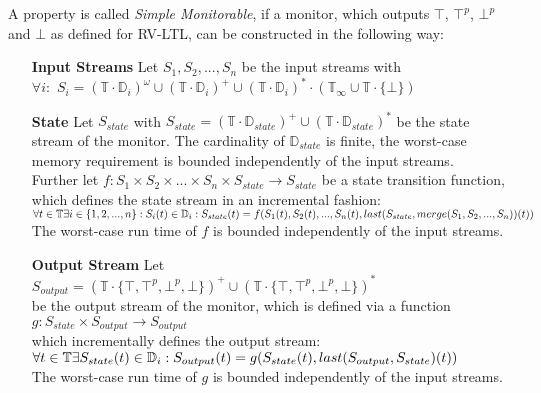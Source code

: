 		\begin{definition}
			A property is called \textit{Simple Monitorable}, if a monitor, which outputs $\top$, $\top^p$, $\bot^p$ and $\bot$ as defined for RV-LTL, can be constructed in the following way:
			\begin{itemize}
				\item[\textbf{Input Streams}]
					Let $S_1, S_2, ..., S_n$ be the input streams with\\
					$\forall i:$ $S_i=(\mathbb{T}\cdot \mathbb{D}_i)^\omega\cup(\mathbb{T}\cdot \mathbb{D}_i)^+\cup(\mathbb{T}\cdot \mathbb{D}_i)^*\cdot(\mathbb{T}_\infty\cup\mathbb{T}\cdot\{\bot\})$
				\item[\textbf{State}]
					Let $S_{state}$ with $S_{state}= (\mathbb{T}\cdot \mathbb{D}_{state})^+\cup(\mathbb{T}\cdot \mathbb{D}_{state})^*$ be the state stream of the monitor. The cardinality of $\mathbb{D}_{state}$ is finite, the worst-case memory requirement is bounded independently of the input streams.\\
					Further let $f: S_1 \times S_2 \times ... \times S_n \times S_{state}\rightarrow S_{state}$ be a state transition function, which defines the state stream in an incremental fashion:\\
					\begin{math}
						\forall t\in \mathbb T \exists i\in \{1,2,...,n\}: S_i(t)\in\mathbb D_i:\\
						S_{state}(t)= f(S_1(t), S_2(t), ..., S_n(t), last(S_{state}, merge(S_1, S_2, ..., S_n))(t))
					\end{math}\\
					The worst-case run time of $f$ is bounded independently of the input streams.
				\item[\textbf{Output Stream}]
					Let $S_{output}= (\mathbb{T}\cdot \{\top, \top^p, \bot^p, \bot\})^+\cup(\mathbb{T}\cdot \{\top, \top^p, \bot^p, \bot\})^*$\\
					be the output stream of the monitor, which is defined via a function\\
					$g:S_{state}\times S_{output}\rightarrow S_{output}$\\
					which incrementally defines the output stream:\\
					\begin{math}
						\forall t\in \mathbb T \exists S_{state}(t)\in\mathbb D_i:\\
						S_{output}(t)= g(S_{state}(t), last(S_{output}, S_{state})(t))
					\end{math}\\
					The worst-case run time of $g$ is bounded independently of the input streams.
			\end{itemize}
		\end{definition}
